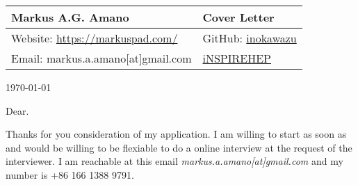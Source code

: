 \documentclass[fontsize=12pt]{article}
\begin{document}
\begin{center}
  \begin{tabularx}{\textwidth} { 
      >{\raggedright\arraybackslash}X 
    >{\raggedleft\arraybackslash}X  }
    \huge Markus A.G. Amano & Cover Letter\\
    \hline
    Website: \url{https://markuspad.com/}& 
    GitHub: \href{https://github.com/inokawazu}{inokawazu}\\
    Email: markus.a.amano[at]gmail.com & \href{https://inspirehep.net/authors/1778034}{iNSPIREHEP}\\
  \end{tabularx}
\end{center}

\today

Dear.



Thanks for you consideration of my application.
I am willing to start as soon as and would be willing to be flexiable to do a online interview 
at the request of the interviewer.
I am reachable at this email \textit{markus.a.amano[at]gmail.com} and my number is 
{+86 166 1388 9791}.
\end{document}
